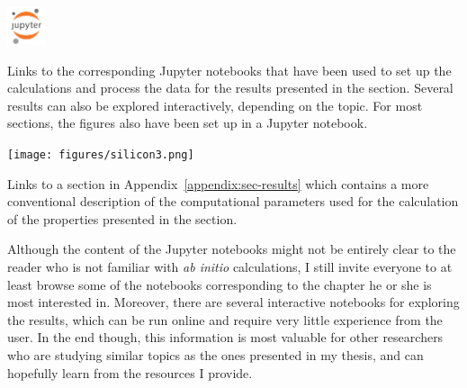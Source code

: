 \begin{refsection}
\vspace{1em}
\begin{minipage}{0.09\textwidth}
\includegraphics[width=3em]{figures/jupyter.png}
\end{minipage}
\begin{minipage}{0.9\textwidth}
Links to the corresponding Jupyter notebooks that have been used to set up the calculations and process the data for the results presented in the section. Several results can also be explored interactively, depending on the topic. For most sections, the figures also have been set up in a Jupyter notebook.
\end{minipage}

\vspace{1em}
\begin{minipage}{0.09\textwidth}
\texttt{[image: figures/silicon3.png]}
\end{minipage}
\begin{minipage}{0.9\textwidth}
Links to a section in Appendix~\ref{appendix:sec-results} which contains a more conventional description of the computational parameters used for the calculation of the properties presented in the section.
\end{minipage}

\vspace{1em}
Although the content of the Jupyter notebooks might not be entirely clear to the reader who is not familiar with \textit{ab initio} calculations, I still invite everyone to at least browse some of the notebooks corresponding to the chapter he or she is most interested in. Moreover, there are several interactive notebooks for exploring the results, which can be run online and require very little experience from the user. In the end though, this information is most valuable for other researchers who are studying similar topics as the ones presented in my thesis, and can hopefully learn from the resources I provide.


\printbibliography 
\end{refsection} 

